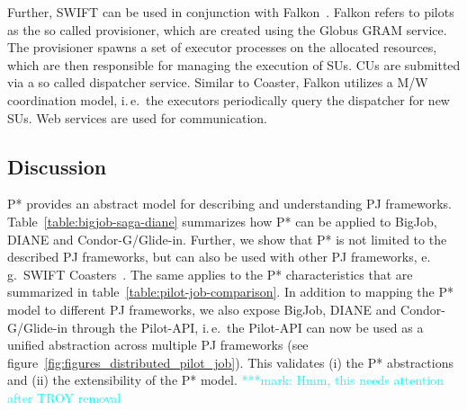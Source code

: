 \documentclass[conference,final]{IEEEtran}
\newcommand{\msnote}[1]{ {\textcolor{cyan} { ***mark: #1 }}}
\newcommand{\note}[1]{ {\textcolor{magenta} { ***Note: #1 }}}
\newcommand{\msnote}[1]{}
\newcommand{\note}[1]{}
\newcommand{\cus}{CUs\xspace}
\begin{document}
Further, SWIFT can be used in conjunction with Falkon~\cite{1362680}. Falkon
refers to pilots as the so called provisioner, which are created using the
Globus GRAM service. The provisioner spawns a set of executor processes on the
allocated resources, which are then responsible for managing the execution of
SUs. \cus are submitted via a so called dispatcher service. Similar to Coaster,
Falkon utilizes a M/W coordination model, i.\,e.\ the executors periodically
query the dispatcher for new SUs. Web services are used for communication.


\subsection{Discussion}

P* provides an abstract model for describing and understanding PJ
frameworks. Table~\ref{table:bigjob-saga-diane} summarizes how P* can
be applied to BigJob, DIANE and Condor-G/Glide-in. Further, we show
that P* is not limited to the described PJ frameworks, but can also be
used with other PJ frameworks, e.\,g.\ SWIFT
Coasters~\cite{coasters}. The same applies to the P* characteristics
that are summarized in table~\ref{table:pilot-job-comparison}. In
addition to mapping the P* model to different PJ frameworks, we also
expose BigJob, DIANE and Condor-G/Glide-in through the Pilot-API,
i.\,e.\ the Pilot-API can now be used as a unified abstraction across
multiple PJ frameworks (see
figure~\ref{fig:figures_distributed_pilot_job}).  This validates (i)
the P* abstractions and (ii) the extensibility of the P*
model. \msnote{Hmm, this needs attention after TROY removal}


% 
\end{document}
